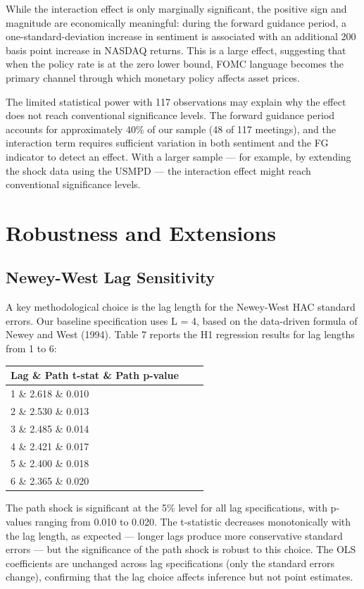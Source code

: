 \documentclass[12pt]{article}
\begin{document}
While the interaction effect is only marginally significant, the positive sign and magnitude are economically meaningful: during the forward guidance period, a one-standard-deviation increase in sentiment is associated with an additional 200 basis point increase in NASDAQ returns. This is a large effect, suggesting that when the policy rate is at the zero lower bound, FOMC language becomes the primary channel through which monetary policy affects asset prices.

The limited statistical power with 117 observations may explain why the effect does not reach conventional significance levels. The forward guidance period accounts for approximately 40\% of our sample (48 of 117 meetings), and the interaction term requires sufficient variation in both sentiment and the FG indicator to detect an effect. With a larger sample --- for example, by extending the shock data using the USMPD --- the interaction effect might reach conventional significance levels.


\section{Robustness and Extensions}

\subsection{Newey-West Lag Sensitivity}

A key methodological choice is the lag length for the Newey-West HAC standard errors. Our baseline specification uses L = 4, based on the data-driven formula of Newey and West (1994). Table 7 reports the H1 regression results for lag lengths from 1 to 6:

\begin{table}[htbp]
\centering
\begin{tabular}{lcc}
\toprule
Lag \& Path t-stat \& Path p-value \\
\midrule
1 \& 2.618 \& 0.010 \\
2 \& 2.530 \& 0.013 \\
3 \& 2.485 \& 0.014 \\
4 \& 2.421 \& 0.017 \\
5 \& 2.400 \& 0.018 \\
6 \& 2.365 \& 0.020 \\
\bottomrule
\end{tabular}
\end{table}

The path shock is significant at the 5\% level for all lag specifications, with p-values ranging from 0.010 to 0.020. The t-statistic decreases monotonically with the lag length, as expected --- longer lags produce more conservative standard errors --- but the significance of the path shock is robust to this choice. The OLS coefficients are unchanged across lag specifications (only the standard errors change), confirming that the lag choice affects inference but not point estimates.
\end{document}
